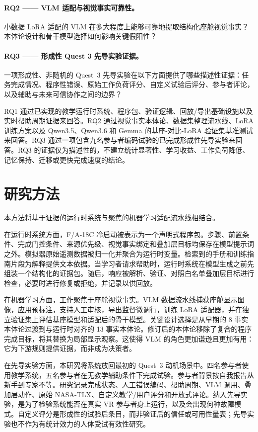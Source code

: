 \paragraph{RQ2 —— VLM 适配与视觉事实可靠性。}
小数据 LoRA 适配的 VLM 在多大程度上能够可靠地提取结构化座舱视觉事实？本体论设计和骨干模型选择如何影响关键假阳性？

\paragraph{RQ3 —— 形成性 Quest 3 先导实验证据。}
一项形成性、非随机的 Quest~3 先导实验在以下方面提供了哪些描述性证据：任务完成情况、程序性错误、原始工作负荷评分、自定义试验后评分、参与者评论，以及辅助与未来可信协作之间的边界？

RQ1 通过已实现的教学运行时系统、程序包、验证逻辑、回放/导出基础设施以及实时帮助周期证据来回答。RQ2 通过视觉事实本体论、数据集整理流水线、LoRA 训练方案以及 Qwen3.5、Qwen3.6 和 Gemma 的基座-对比-LoRA 验证集基准测试来回答。RQ3 通过一项包含九名参与者编码试验的已完成形成性先导实验来回答。RQ3 的证据仅为描述性的，不建立统计显著性、学习收益、工作负荷降低、记忆保持、迁移或更快完成速度的结论。

\section{研究方法}\label{sec:intro-approach}

本方法将基于证据的运行时系统与聚焦的机器学习适配流水线相结合。

在运行时系统方面，F/A-18C 冷启动被表示为一个声明式程序包。步骤、前置条件、完成门控条件、来源优先级、视觉事实绑定和叠加层目标均保存在模型提示词之外。模拟器原始遥测数据被归一化并聚合为运行时变量。检索到的手册和训练指南片段为解释提供文本依据。当学习者请求帮助时，运行时系统在模型生成之前先组装一个结构化的证据包。随后，响应被解析、验证、对照白名单叠加层目标进行检查，必要时进行修复或拒绝，并记录以供回放。

在机器学习方面，工作聚焦于座舱视觉事实。VLM 数据流水线捕获座舱显示图像，应用预标注，支持人工审核，导出监督微调行，训练 LoRA 适配器，并在独立验证集上评估基座模型和适配后的骨干模型。关键设计选择是从早期的 8 事实本体论过渡到与运行时对齐的 13 事实本体论。修订后的本体论移除了复合的程序完成目标，将其替换为局部显示观察。这使得 VLM 的角色更加谦逊且更加有用：它为下游规则提供证据，而非成为决策者。

在先导实验方面，本研究将系统放回最初的 Quest~3 动机场景中。四名参与者使用教学系统，五名参与者在无教学辅助条件下完成试验。参与者背景按自我报告从新手到专家不等。研究记录完成状态、人工错误编码、帮助周期、VLM 调用、叠加层动作、原始 NASA-TLX、自定义教学/用户评分和开放式评论。纳入先导实验，是为了检验系统能否在真实 VR 参与者身上运行，以及会出现何种故障模式。自定义评分是形成性的试验后条目，而非验证后的信任或可用性量表；先导实验也不作为有统计效力的人体受试有效性研究。

